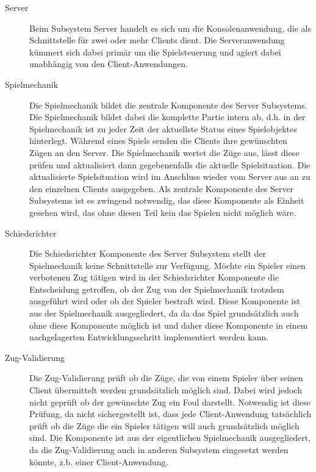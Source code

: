 		\begin{description}
			
			\item[Server]
			Beim Subsystem Server handelt es sich um die Konsolenanwendung, die als Schnittstelle für zwei oder mehr Clients dient. Die Serveranwendung kümmert sich dabei primär um die Spielsteuerung und agiert dabei unabhängig von den Client-Anwendungen.
			
			\item[Spielmechanik]
			Die Spielmechanik bildet die zentrale Komponente des Server Subsystems. Die Spielmechanik bildet dabei die komplette Partie intern ab, d.h. in der Spielmechanik ist zu jeder Zeit der aktuellste Status eines Spielobjektes hinterlegt. Während eines Spiels senden die Clients ihre gewünschten Zügen an den Server. Die Spielmechanik wertet die Züge aus, lässt diese prüfen und aktualisiert dann gegebenenfalls die aktuelle Spielsituation. Die aktualisierte Spielsituation wird im Anschluss wieder vom Server aus an zu den einzelnen Clients ausgegeben. Als zentrale Komponente des Server Subsystems ist es zwingend notwendig, das diese Komponente als Einheit gesehen wird, das ohne diesen Teil kein das Spielen nicht möglich wäre.
			
			\item[Schiedsrichter]
			Die Schiedsrichter Komponente des Server Subsystem stellt der Spielmechanik keine Schnittstelle zur Verfügung. Möchte ein Spieler einen verbotenen Zug tätigen wird in der Schiedsrichter Komponente die Entscheidung getroffen, ob der Zug von der Spielmechanik trotzdem ausgeführt wird oder ob der Spieler bestraft wird. Diese Komponente ist aus der Spielmechanik ausgegliedert, da da das Spiel grundsätzlich auch ohne diese Komponente möglich ist und daher diese Komponente in einem nachgelagerten Entwicklungsschritt implementiert werden kann.
	
			\item[Zug-Validierung]
			Die Zug-Validierung prüft ob die Züge, die von einem Spieler über seinen Client übermittelt werden grundsätzlich möglich sind. Dabei wird jedoch nicht geprüft ob der gewünschte Zug ein Foul darstellt. Notwendig ist diese Prüfung, da nicht sichergestellt ist, dass jede Client-Anwendung tatsächlich prüft ob die Züge die ein Spieler tätigen will auch grundsätzlich möglich sind. Die Komponente ist aus der eigentlichen Spielmechanik ausgegliedert, da die Zug-Validierung auch in anderen Subsystem eingesetzt werden könnte, z.b. einer Client-Anwendung.
			

\end{description}
